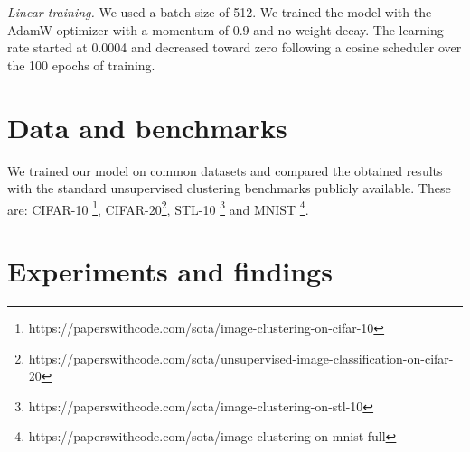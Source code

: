 \documentclass{article}
\begin{document}
\textit{Linear training.} We used a batch size of 512. We trained the model with the AdamW optimizer with a momentum of 0.9 and no weight decay. The learning rate started at 0.0004 and decreased toward zero following a cosine scheduler over the 100 epochs of training.

\section{Data and benchmarks}
\label{sec:data}

We trained our model on common datasets and compared the obtained results with the standard unsupervised clustering benchmarks publicly available. These are: CIFAR-10 \cite{cifar_10}\footnote{https://paperswithcode.com/sota/image-clustering-on-cifar-10}, CIFAR-20\footnote{https://paperswithcode.com/sota/unsupervised-image-classification-on-cifar-20}, STL-10 \cite{stl_10} \footnote{https://paperswithcode.com/sota/image-clustering-on-stl-10} and MNIST \cite{mnist}\footnote{https://paperswithcode.com/sota/image-clustering-on-mnist-full}. 

\section{Experiments and findings}
\label{sec:results}
\end{document}
